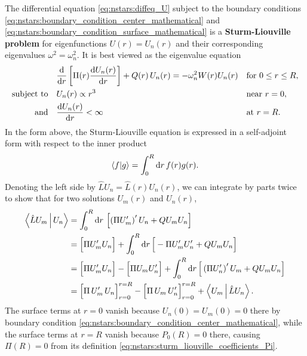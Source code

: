 The differential equation \eqref{eq:nstars:diffeq_U} subject to the boundary conditions \eqref{eq:nstars:boundary_condition_center_mathematical} and \eqref{eq:nstars:boundary_condition_surface_mathematical} is a \textbf{Sturm-Liouville problem} for eigenfunctions $U(r) = U_n(r)$ and their corresponding eigenvalues $\omega^2 = \omega_n^2$.
It is best viewed as the eigenvalue equation
\begin{subequations}
\begin{align}
	&\odv*{ \left[ \Pi(r) \odv{U_n(r)}{r} \right] }{r} + Q(r) \, U_n(r) = -\omega_n^2 W(r) U_n(r) && \text{for } 0 \leq r \leq R , \label{eq:nstars:sturm_liouville} \\
	\text{subject to} \quad & U_n(r)          \propto r^3    && \text{near } r=0 , \\
	\text{and}        \quad & \odv{U_n(r)}{r} <       \infty && \text{at } r=R .
\label{eq:nstars:sturm_liouville_boundary_conditions}%
\end{align}%
\label{eq:nstars:sturm_liouville_problem}%
\end{subequations}
In the form above, the Sturm-Liouville equation is expressed in a self-adjoint form with respect to the inner product
\begin{equation}
	\braket{f | g} = \int_0^R \mathop{}\!\mathrm{d} r \, f(r) g(r) .
\label{eq:nstars:function_inner_product}
\end{equation}
Denoting the left side by $\hat{L} U_n = \hat{L}(r) U_n(r)$, we can integrate by parts twice to show that for two solutions $U_m(r)$ and $U_n(r)$,
\begin{equation}
\begin{split}
	\Braket{\hat{L} U_m | U_n} &= \int_0^R \mathop{}\!\mathrm{d} r \, \left[ \left( \Pi U_m' \right)' U_n + Q U_m U_n \right] \\
	                           &= \Big[ \Pi U_m' U_n \Big] + \int_0^R \mathop{}\!\mathrm{d} r \, \Big[ - \Pi U_m' U_n' + Q U_m U_n \Big] \\
	                           &= \Big[ \Pi U_m' U_n \Big] - \Big[ \Pi U_m U_n' \Big] + \int_0^R \mathop{}\!\mathrm{d} r \, \Big[ \left( \Pi U_n' \right)' U_m + Q U_m U_n \Big] \\
	                           &= \Big[ \Pi \, U_m' \, U_n \Big]_{r=0}^{r=R} - \Big[ \Pi \, U_m \, U_n' \Big]_{r=0}^{r=R} + \Braket{U_m | \hat{L} U_n} . \\
\end{split}
\end{equation}
The surface terms at $r = 0$ vanish because $U_n(0) = U_m(0) = 0$ there by boundary condition \eqref{eq:nstars:boundary_condition_center_mathematical}, while the surface terms at $r = R$ vanish because $P_0(R) = 0$ there, causing $\Pi(R) = 0$ from its definition \eqref{eq:nstars:sturm_liouville_coefficients_Pi}.
